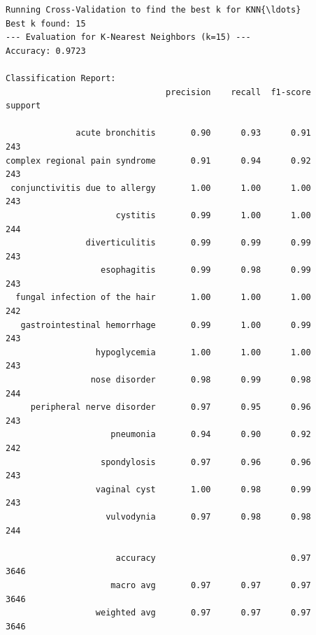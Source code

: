 \documentclass[11pt]{article}
\begin{document}
    \begin{Verbatim}[commandchars=\\\{\}]
Running Cross-Validation to find the best k for KNN{\ldots}
Best k found: 15
--- Evaluation for K-Nearest Neighbors (k=15) ---
Accuracy: 0.9723

Classification Report:
                                precision    recall  f1-score   support

              acute bronchitis       0.90      0.93      0.91       243
complex regional pain syndrome       0.91      0.94      0.92       243
 conjunctivitis due to allergy       1.00      1.00      1.00       243
                      cystitis       0.99      1.00      1.00       244
                diverticulitis       0.99      0.99      0.99       243
                   esophagitis       0.99      0.98      0.99       243
  fungal infection of the hair       1.00      1.00      1.00       242
   gastrointestinal hemorrhage       0.99      1.00      0.99       243
                  hypoglycemia       1.00      1.00      1.00       243
                 nose disorder       0.98      0.99      0.98       244
     peripheral nerve disorder       0.97      0.95      0.96       243
                     pneumonia       0.94      0.90      0.92       242
                   spondylosis       0.97      0.96      0.96       243
                  vaginal cyst       1.00      0.98      0.99       243
                    vulvodynia       0.97      0.98      0.98       244

                      accuracy                           0.97      3646
                     macro avg       0.97      0.97      0.97      3646
                  weighted avg       0.97      0.97      0.97      3646

    \end{Verbatim}

    \begin{center}
    \end{center}
    { \hspace*{\fill} \\}
    
\end{document}
